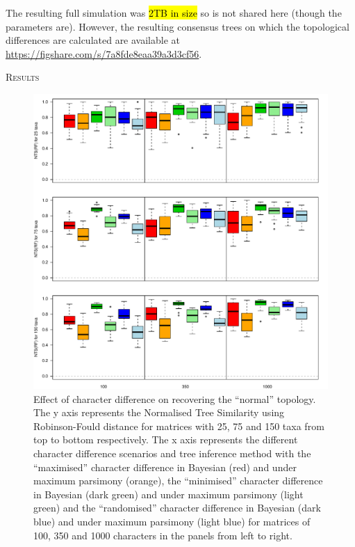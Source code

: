 \documentclass[12pt,letterpaper]{article}
\renewcommand{\section}[1]{%
\bigskip
\begin{center}
\begin{Large}
\normalfont\scshape #1
\medskip
\end{Large}
\end{center}}
\begin{document}
The resulting full simulation was \hl{2TB in size} so is not shared here (though the parameters are).
However, the resulting consensus trees on which the topological differences are calculated are available at \url{https://figshare.com/s/7a8fde8eaa39a3d3cf56}.

\section{Results}

\begin{figure}[!htbp]
\centering
   \includegraphics[width=1\textwidth]{Figures/RF_results_best.pdf}
\caption{\small{Effect of character difference on recovering the ``normal'' topology. The y axis represents the Normalised Tree Similarity using Robinson-Fould distance for matrices with 25, 75 and 150 taxa from top to bottom respectively. The x axis represents the different character difference scenarios and tree inference method with the ``maximised'' character difference in Bayesian (red) and under maximum parsimony (orange), the ``minimised'' character difference in Bayesian (dark green) and under maximum parsimony (light green) and the ``randomised'' character difference in Bayesian (dark blue) and under maximum parsimony (light blue) for matrices of 100, 350 and 1000 characters in the panels from left to right.}}
\label{Fig:RF_results_best}
\end{figure}
\end{document}
